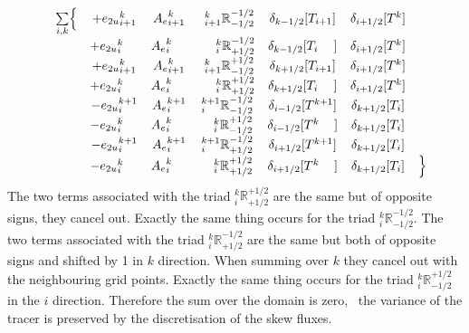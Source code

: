 \documentclass[../main/NEMO_manual]{subfiles}
\begin{document}
\begin{align*}
  \begin{matrix}
    &\sum\limits_{i,k}   \Bigl\{
    &+{e_{2u}}_{i+1}^{k}                             &{A_{e}}_{i+1    }^{k}
    &\ {_{i+1}^k \mathbb{R}_{- 1/2}^{-1/2}} &\delta_{k-1/2}[T_{i+1}]    &\delta_{i+1/2}[T^{k}]   &\\
    &&+{e_{2u}}_i^{k\ \ \ \:}                            &{A_{e}}_{i}^{k\ \ \ \:}
    &\ {\ \ \;_i^k \mathbb{R}_{+1/2}^{-1/2}}  &\delta_{k-1/2}[T_{i\ \ \ \;}]  &\delta_{i+1/2}[T^{k}] &\\
    &&+{e_{2u}}_{i+1}^{k}                             &{A_{e}}_{i+1    }^{k}
    &\ {_{i+1}^k \mathbb{R}_{- 1/2}^{+1/2}} &\delta_{k+1/2}[T_{i+1}]     &\delta_{i+1/2}[T^{k}] &\\
    &&+{e_{2u}}_i^{k\ \ \ \:}                            &{A_{e}}_{i}^{k\ \ \ \:}
    &\ {\ \ \;_i^k \mathbb{R}_{+1/2}^{+1/2}} &\delta_{k+1/2}[T_{i\ \ \ \;}] &\delta_{i+1/2}[T^{k}] &\\
    &&-{e_{2u}}_i^{k+1}                                &{A_{e}}_i^{k+1}
    &{_i^{k+1} \mathbb{R}_{-1/2}^{- 1/2}}   &\delta_{i-1/2}[T^{k+1}]      &\delta_{k+1/2}[T_{i}] &\\
    &&-{e_{2u}}_i^{k\ \ \ \:}                             &{A_{e}}_i^{k\ \ \ \:}
    &{\ \ \;_i^k  \mathbb{R}_{-1/2}^{+1/2}}   &\delta_{i-1/2}[T^{k\ \ \ \:}]  &\delta_{k+1/2}[T_{i}] &\\
    &&-{e_{2u}}_i^{k+1    }                             &{A_{e}}_i^{k+1}
    &{_i^{k+1} \mathbb{R}_{+1/2}^{- 1/2}}   &\delta_{i+1/2}[T^{k+1}]      &\delta_{k+1/2}[T_{i}] &\\
    &&-{e_{2u}}_i^{k\ \ \ \:}                             &{A_{e}}_i^{k\ \ \ \:}
    &{\ \ \;_i^k  \mathbb{R}_{+1/2}^{+1/2}}   &\delta_{i+1/2}[T^{k\ \ \ \:}]  &\delta_{k+1/2}[T_{i}]
    &\Bigr\}  \\
  \end{matrix}
\end{align*}
The two terms associated with the triad ${_i^k \mathbb{R}_{+1/2}^{+1/2}}$ are the same but of opposite signs,
they cancel out.
Exactly the same thing occurs for the triad ${_i^k \mathbb{R}_{-1/2}^{-1/2}}$.
The two terms associated with the triad ${_i^k \mathbb{R}_{+1/2}^{-1/2}}$ are the same but both of opposite signs and
shifted by 1 in $k$ direction.
When summing over $k$ they cancel out with the neighbouring grid points.
Exactly the same thing occurs for the triad ${_i^k \mathbb{R}_{-1/2}^{+1/2}}$ in the $i$ direction.
Therefore the sum over the domain is zero,
\ie\ the variance of the tracer is preserved by the discretisation of the skew fluxes.

\subinc{}
\end{document}
